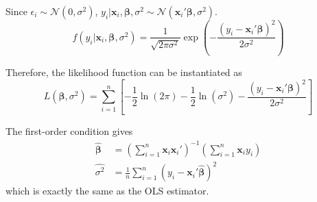 \documentclass[%
 aip,
 jmp,%
 amsmath,amssymb,
 reprint,%
]{revtex4-1}
\def\N{{\mathbb N}}
\def\b{\beta}
\def\e{\epsilon}
\def\s{\sigma}
\def\N{\mathcal{N}} %
\def\h{\hat}
\def\l{\left}
\def\r{\right}
\newcommand{\sumn}[1]{\sum_{i=1}^{n} #1}
\newcommand{\mean}[1]{\frac{1}{n}\sum_{i=1}^{n} #1}
\renewcommand{\vec}[1]{\bm{#1}}
\begin{document}
Since $\e_i \sim \N(0,\s^2)$, $y_i|\vec x_i, \vec\b, \s^2 \sim \N(\vec x_i'\vec\b, \s^2)$.
$$ f(y_i|\vec x_i, \vec\b, \s^2) = \frac{1}{\sqrt{2\pi\s^2}}\exp\l(-\frac{(y_i - \vec x_i'\vec\b)^2}{2\s^2}\r)$$

Therefore, the likelihood function can be instantiated as
$$ L(\vec\b, \s^2) = \sumn \left[ -\frac{1}{2}\ln (2\pi) - \frac{1}{2}\ln(\s^2) - \frac{(y_i - \vec x_i'\vec\b)^2}{2\s^2} \right] $$

The first-order condition gives
\begin{align*}
  \vec{\h\b} &= \l( \sumn \vec x_i \vec x_i' \r)^{-1} \l( \sumn \vec x_i y_i \r) \\
  \h{\s^2} &= \mean (y_i - \vec x_i' \vec{\h\b})^2
\end{align*}
which is exactly the same as the OLS estimator.

\vspace{7.5in} %
\end{document}
